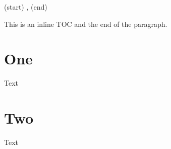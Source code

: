 \documentclass{article}
\begin{document}
  {(start) }
  {\etocname, }%
  {}
  {(end) }%


\etocinline %

\etocsettocstyle{}{} %

This is an inline TOC
\tableofcontents
and the end of the paragraph.

\section{One}

Text

\section{Two}

Text
\end{document}
